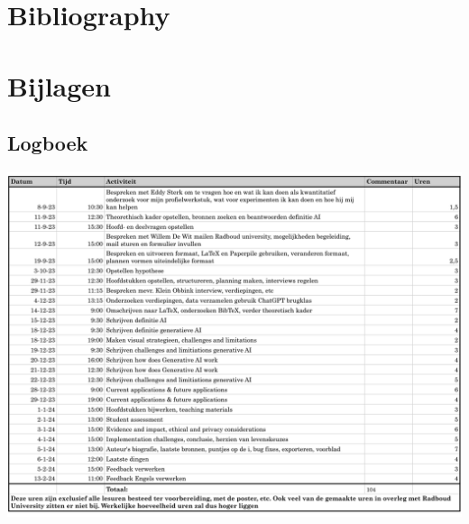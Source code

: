 \documentclass[a4paper,12pt]{report}
\begin{document}
\newpage
\begingroup
\section{Bibliography} \label{sect:bibliography}
\let\clearpage\relax
\renewcommand{\bibname}{}


\endgroup

\newpage
\section*{Bijlagen} \label{sect:bijlagen}
\thispagestyle{empty}
\subsection*{Logboek}
\hspace*{-3.5cm}
\includegraphics[width=1.385\textwidth,keepaspectratio=true]{Logboek.png}
\end{document}
